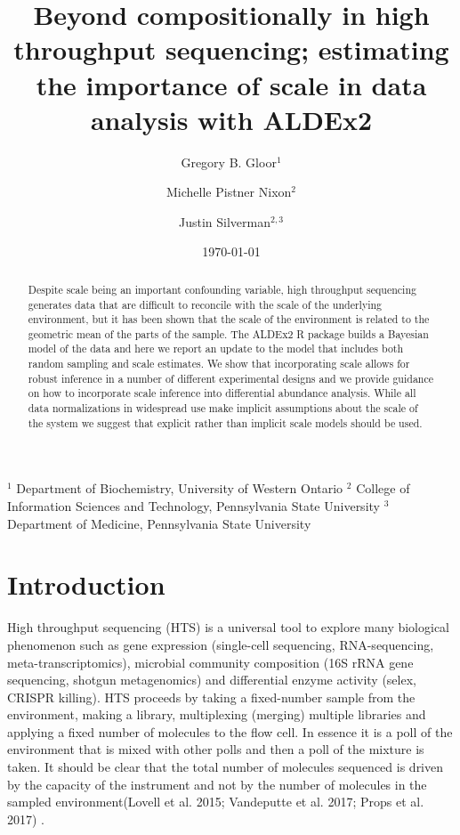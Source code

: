\documentclass[
]{article}
\title{Beyond compositionally in high throughput sequencing; estimating
the importance of scale in data analysis with ALDEx2}
\author{Gregory B. Gloor$^1$ \and Michelle Pistner Nixon$^2$ \and Justin Silverman$^{2,3}$}
\date{\today}
\begin{document}
\maketitle

$^1$ Department of Biochemistry, University of Western Ontario
$^2$ College of Information Sciences and Technology, Pennsylvania  State University
$^3$ Department of Medicine, Pennsylvania  State University

\begin{abstract}
Despite scale being an important confounding variable, high throughput
sequencing generates data that are difficult to reconcile with the scale
of the underlying environment, but it has been shown that the scale of
the environment is related to the geometric mean of the parts of the
sample. The ALDEx2 R package builds a Bayesian model of the data and
here we report an update to the model that includes both random sampling
and scale estimates. We show that incorporating scale allows for robust
inference in a number of different experimental designs and we provide
guidance on how to incorporate scale inference into differential
abundance analysis. While all data normalizations in widespread use make
implicit assumptions about the scale of the system we suggest that
explicit rather than implicit scale models should be used.
\end{abstract}

\hypertarget{introduction}{%
\section{Introduction}\label{introduction}}

High throughput sequencing (HTS) is a universal tool to explore many
biological phenomenon such as gene expression (single-cell sequencing,
RNA-sequencing, meta-transcriptomics), microbial community composition
(16S rRNA gene sequencing, shotgun metagenomics) and differential enzyme
activity (selex, CRISPR killing). HTS proceeds by taking a fixed-number
sample from the environment, making a library, multiplexing (merging)
multiple libraries and applying a fixed number of molecules to the flow
cell. In essence it is a poll of the environment that is mixed with
other polls and then a poll of the mixture is taken. It should be clear
that the total number of molecules sequenced is driven by the capacity
of the instrument and not by the number of molecules in the sampled
environment(Lovell et al. 2015; Vandeputte et al. 2017; Props et al.
2017) .
\end{document}
